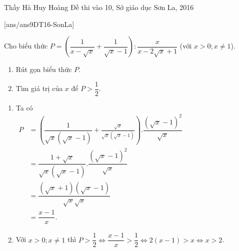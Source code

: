 \begin{name}
{Thầy  Hà Huy Hoàng}
{Đề thi vào 10, Sở giáo dục Sơn La, 2016}
\end{name}
\setcounter{ex}{0}
[ans/ans9DT16-SonLa]
\begin{ex}%
Cho biểu thức $P = \left(\dfrac {1}{x - \sqrt {x}} + \dfrac {1}{\sqrt {x} -1} \right) : \dfrac{x}{x - 2 \sqrt{x} + 1}$ (với $x > 0; x \ne 1$).
\begin{enumerate}
\item Rút gọn biểu thức $P$.
\item Tìm giá trị của $x$ để $P > \dfrac{1}{2}$.
\end{enumerate}
\loigiai
    {
\begin{enumerate}
\item Ta có\\
$\begin{aligned}
 P& =\left( \dfrac{1}{\sqrt{x}(\sqrt{x}-1)}+\frac{\sqrt{x}}{\sqrt{x}(\sqrt{x}-1)} \right).\dfrac{{{(\sqrt{x}-1)}^{2}}}{\sqrt{x}} \\ 
 & =\dfrac{1+\sqrt{x}}{\sqrt{x}(\sqrt{x}-1)}.\dfrac{{{(\sqrt{x}-1)}^{2}}}{\sqrt{x}} \\ 
 & =\dfrac{(\sqrt{x}+1)(\sqrt{x}-1)}{\sqrt{x}\sqrt{x}} \\ 
 & =\dfrac{x-1}{x}.
\end{aligned}$
\item Với $x > 0; x \ne 1$ thì $P>\dfrac{1}{2}\Leftrightarrow \dfrac{x-1}{x}>\dfrac{1}{2}\Leftrightarrow  2(x-1)> x \Leftrightarrow  x>2$.
\end{enumerate}
    }
\end{ex}

